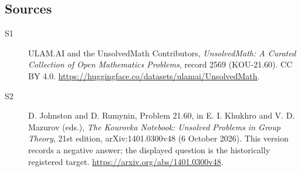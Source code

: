 \documentclass[11pt]{article}
\begin{document}
\subsection{Sources}
\begin{description}
\item[\hypertarget{source:2569:1}{S1}] ULAM.AI and the UnsolvedMath Contributors, \emph{UnsolvedMath: A Curated Collection of Open Mathematics Problems}, record 2569 (KOU-21.60). CC BY 4.0. \url{https://huggingface.co/datasets/ulamai/UnsolvedMath}.
\item[\hypertarget{source:2569:2}{S2}] D. Johnston and D. Rumynin, Problem 21.60, in E. I. Khukhro and V. D. Mazurov (eds.), \emph{The Kourovka Notebook: Unsolved Problems in Group Theory}, 21st edition, arXiv:1401.0300v48 (6 October 2026). This version records a negative answer; the displayed question is the historically registered target. \url{https://arxiv.org/abs/1401.0300v48}.
\end{description}
\label{end:2569}
\end{document}
